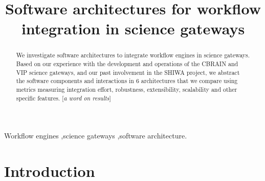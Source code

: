 \documentclass[preprint,3p,twocolumn]{elsarticle}
\newcommand{\todo}[1]{\color{blue}\xspace[\emph{#1}]\xspace\color{black}}
\begin{document}
\begin{frontmatter}



\title{Software architectures for workflow integration in science gateways}


\author{}

\address{}

\begin{abstract}
  We investigate software architectures to integrate workflow engines
  in science gateways. Based on our experience with the development
  and operations of the CBRAIN and VIP science gateways, and our past
  involvement in the SHIWA project, we abstract the software
  components and interactions in 6 architectures that we compare using
  metrics measuring integration effort, robustness, extensibility,
  scalability and other specific features. \todo{a word on results}
\end{abstract}

\begin{keyword}
Workflow engines \sep science gateways \sep software architecture.
\end{keyword}

\end{frontmatter}


\maketitle

\section{Introduction}
\end{document}
